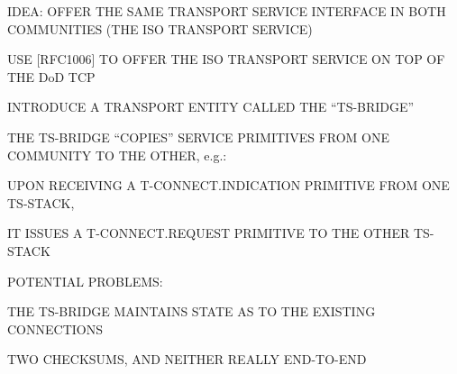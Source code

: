\begin{bwslide}

\begin{nrtc}
\item	IDEA: OFFER THE SAME TRANSPORT SERVICE INTERFACE IN BOTH
	COMMUNITIES (THE ISO TRANSPORT SERVICE)
    \begin{nrtc}
    \item	USE [RFC1006] TO OFFER THE ISO TRANSPORT SERVICE ON TOP OF
		THE DoD TCP
    \end{nrtc}

\item	INTRODUCE A TRANSPORT ENTITY CALLED THE ``TS-BRIDGE''

\item	THE TS-BRIDGE ``COPIES'' SERVICE PRIMITIVES FROM ONE COMMUNITY TO THE
	OTHER, e.g.:
    \begin{nrtc}
    \item	UPON RECEIVING A T-CONNECT.INDICATION PRIMITIVE FROM ONE
		TS-STACK,

    \item	IT ISSUES A T-CONNECT.REQUEST PRIMITIVE TO THE OTHER TS-STACK
    \end{nrtc}

\item	POTENTIAL PROBLEMS:
    \begin{nrtc}
    \item	THE TS-BRIDGE MAINTAINS STATE AS TO THE EXISTING CONNECTIONS

    \item	TWO CHECKSUMS, AND NEITHER REALLY END-TO-END
    \end{nrtc}
\end{nrtc}
\end{bwslide}




